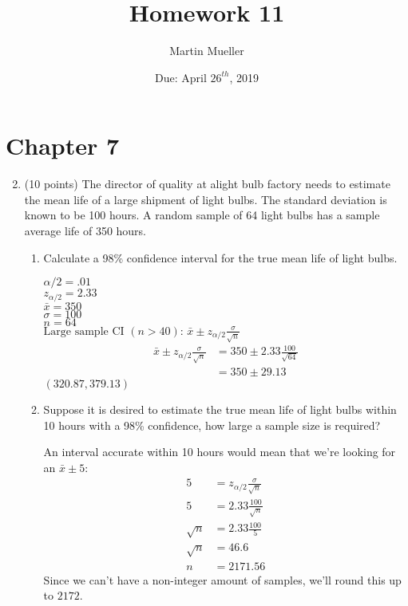 \documentclass[12pt, letter]{article}
\title{Homework 11}
\author{Martin Mueller}
\date{Due: April $26^{th}$, 2019}
\newenvironment{nscenter}
	{\parskip=0pt\par\nopagebreak\centering}
	{\par\noindent\ignorespacesafterend}
\begin{document}
\maketitle
\section*{Chapter 7}
\begin{enumerate}
	\setcounter{enumi}{1}
	\item (10 points) The director of quality at alight bulb factory needs to estimate the mean life of a large shipment of light bulbs. The standard deviation is known to be 100 hours. A random sample of 64 light bulbs has a sample average life of 350 hours.
	\begin{enumerate}
		\item Calculate a 98\% confidence interval for the true mean life of light bulbs.
		\begin{nscenter}
			$\alpha/2 = .01$ \\
			$z_{\alpha/2} = 2.33$ \\
			$\bar{x} = 350$ \\
			$\sigma = 100$ \\
			$n = 64$ \\
			$\text{Large sample CI $(n > 40)$: } \bar{x} \pm z_{\alpha/2}\frac{\sigma}{\sqrt{n}}$
			\begin{align*}
				\bar{x} \pm z_{\alpha/2}\frac{\sigma}{\sqrt{n}} &= 350 \pm 2.33\frac{100}{\sqrt{64}} \\
				&= 350 \pm 29.13
			\end{align*}
			$\boxed{(320.87, 379.13)}$
		\end{nscenter}
		
		\pagebreak
		
		\item Suppose it is desired to estimate the true mean life of light bulbs within 10 hours with a 98\% confidence, how large a sample size is required?
		\begin{center}
			An interval accurate within 10 hours would mean that we're looking for an $\bar{x} \pm 5$:
			\begin{align*}
				5 &= z_{\alpha/2}\frac{\sigma}{\sqrt{n}} \\
				5 &= 2.33 \frac{100}{\sqrt{n}} \\
				\sqrt{n} &= 2.33 \frac{100}{5} \\
				\sqrt{n} &= 46.6 \\
				n &= 2171.56
			\end{align*}
			Since we can't have a non-integer amount of samples, we'll round this up to $\boxed{2172}$.
		\end{center}
	\end{enumerate}
	

\end{enumerate}
\end{document}

